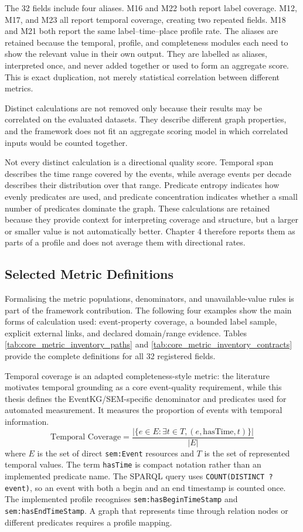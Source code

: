 The 32 fields include four aliases. M16 and M22 both report label coverage. M12, M17, and M23 all report temporal coverage, creating two repeated fields. M18 and M21 both report the same label--time--place profile rate. The aliases are retained because the temporal, profile, and completeness modules each need to show the relevant value in their own output. They are labelled as aliases, interpreted once, and never added together or used to form an aggregate score. This is exact duplication, not merely statistical correlation between different metrics.

Distinct calculations are not removed only because their results may be correlated on the evaluated datasets. They describe different graph properties, and the framework does not fit an aggregate scoring model in which correlated inputs would be counted together.

Not every distinct calculation is a directional quality score. Temporal span describes the time range covered by the events, while average events per decade describes their distribution over that range. Predicate entropy indicates how evenly predicates are used, and predicate concentration indicates whether a small number of predicates dominate the graph. These calculations are retained because they provide context for interpreting coverage and structure, but a larger or smaller value is not automatically better. Chapter 4 therefore reports them as parts of a profile and does not average them with directional rates.

\subsection{Selected Metric Definitions}

Formalising the metric populations, denominators, and unavailable-value rules is part of the framework contribution. The following four examples show the main forms of calculation used: event-property coverage, a bounded label sample, explicit external links, and declared domain/range evidence. Tables \ref{tab:core_metric_inventory_paths} and \ref{tab:core_metric_inventory_contracts} provide the complete definitions for all 32 registered fields.

Temporal coverage is an adapted completeness-style metric: the literature motivates temporal grounding as a core event-quality requirement, while this thesis defines the EventKG/SEM-specific denominator and predicates used for automated measurement. It measures the proportion of events with temporal information.
\begin{equation}
\text{Temporal Coverage} = \frac{|\{e \in E : \exists t \in T, (e, \text{hasTime}, t)\}|}{|E|}
\end{equation}
where $E$ is the set of direct \texttt{sem:Event} resources and $T$ is the set of represented temporal values. The term \texttt{hasTime} is compact notation rather than an implemented predicate name. The SPARQL query uses \texttt{COUNT(DISTINCT ?event)}, so an event with both a begin and an end timestamp is counted once. The implemented profile recognises \texttt{sem:hasBeginTimeStamp} and \texttt{sem:hasEndTimeStamp}. A graph that represents time through relation nodes or different predicates requires a profile mapping.

